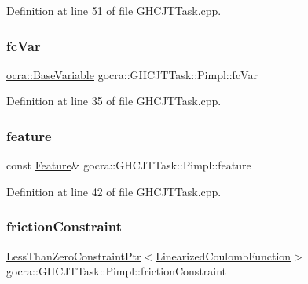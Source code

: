 Definition at line 51 of file G\+H\+C\+J\+T\+Task.\+cpp.

\hypertarget{structgocra_1_1GHCJTTask_1_1Pimpl_a98ad4a4d2e7bbba67daa244e45f75345}{}\label{structgocra_1_1GHCJTTask_1_1Pimpl_a98ad4a4d2e7bbba67daa244e45f75345} 
\subsubsection{\texorpdfstring{fc\+Var}{fcVar}}
{\footnotesize\ttfamily \hyperlink{classocra_1_1BaseVariable}{ocra\+::\+Base\+Variable} gocra\+::\+G\+H\+C\+J\+T\+Task\+::\+Pimpl\+::fc\+Var}



Definition at line 35 of file G\+H\+C\+J\+T\+Task.\+cpp.

\hypertarget{structgocra_1_1GHCJTTask_1_1Pimpl_aa7c75169490e6b35ff7bdb1baf696c5d}{}\label{structgocra_1_1GHCJTTask_1_1Pimpl_aa7c75169490e6b35ff7bdb1baf696c5d} 
\subsubsection{\texorpdfstring{feature}{feature}}
{\footnotesize\ttfamily const \hyperlink{classocra_1_1Feature}{Feature}\& gocra\+::\+G\+H\+C\+J\+T\+Task\+::\+Pimpl\+::feature}



Definition at line 42 of file G\+H\+C\+J\+T\+Task.\+cpp.

\hypertarget{structgocra_1_1GHCJTTask_1_1Pimpl_a51c9a1862cf46b8ac75a525924d990bb}{}\label{structgocra_1_1GHCJTTask_1_1Pimpl_a51c9a1862cf46b8ac75a525924d990bb} 
\subsubsection{\texorpdfstring{friction\+Constraint}{frictionConstraint}}
{\footnotesize\ttfamily \hyperlink{classocra_1_1LessThanZeroConstraintPtr}{Less\+Than\+Zero\+Constraint\+Ptr}$<$\hyperlink{classocra_1_1LinearizedCoulombFunction}{Linearized\+Coulomb\+Function}$>$ gocra\+::\+G\+H\+C\+J\+T\+Task\+::\+Pimpl\+::friction\+Constraint}



